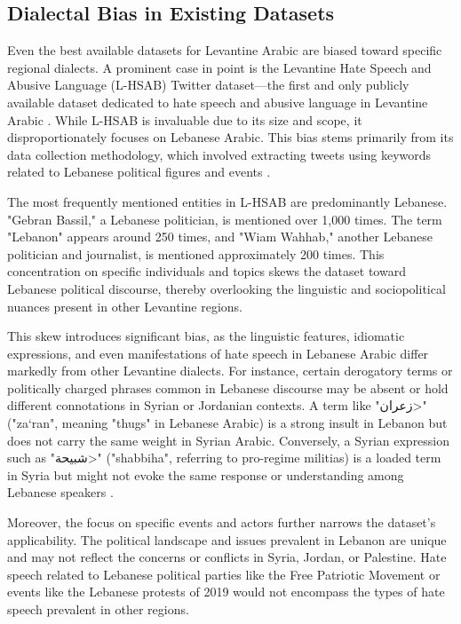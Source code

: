 \documentclass[11pt]{article}
\begin{document}
\subsection{Dialectal Bias in Existing Datasets}

Even the best available datasets for Levantine Arabic are biased toward specific regional dialects. A prominent case in point is the Levantine Hate Speech and Abusive Language (L-HSAB) Twitter dataset—the first and only publicly available dataset dedicated to hate speech and abusive language in Levantine Arabic \citep{mulki-etal-2019-l}. While L-HSAB is invaluable due to its size and scope, it disproportionately focuses on Lebanese Arabic. This bias stems primarily from its data collection methodology, which involved extracting tweets using keywords related to Lebanese political figures and events \citep{f5a0fc6c-286b-3484-9927-c1949a72ae5c}.

The most frequently mentioned entities in L-HSAB are predominantly Lebanese. "Gebran Bassil," a Lebanese politician, is mentioned over 1,000 times. The term "Lebanon" appears around 250 times, and "Wiam Wahhab," another Lebanese politician and journalist, is mentioned approximately 200 times. This concentration on specific individuals and topics skews the dataset toward Lebanese political discourse, thereby overlooking the linguistic and sociopolitical nuances present in other Levantine regions.

This skew introduces significant bias, as the linguistic features, idiomatic expressions, and even manifestations of hate speech in Lebanese Arabic differ markedly from other Levantine dialects. For instance, certain derogatory terms or politically charged phrases common in Lebanese discourse may be absent or hold different connotations in Syrian or Jordanian contexts. A term like "\<زعران>" ("za‘ran", meaning "thugs" in Lebanese Arabic) is a strong insult in Lebanon but does not carry the same weight in Syrian Arabic. Conversely, a Syrian expression such as "\<شبيحة>" ("shabbiha", referring to pro-regime militias) is a loaded term in Syria but might not evoke the same response or understanding among Lebanese speakers \citep{doi:10.1177/2633002420907771}. 

Moreover, the focus on specific events and actors further narrows the dataset's applicability. The political landscape and issues prevalent in Lebanon are unique and may not reflect the concerns or conflicts in Syria, Jordan, or Palestine. Hate speech related to Lebanese political parties like the Free Patriotic Movement or events like the Lebanese protests of 2019 would not encompass the types of hate speech prevalent in other regions.
\end{document}
